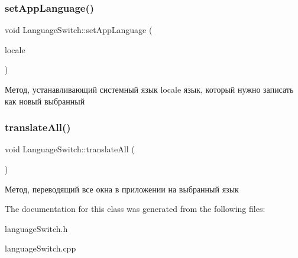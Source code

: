 \subsubsection{\texorpdfstring{setAppLanguage()}{setAppLanguage()}}
{\footnotesize\ttfamily void Language\+Switch\+::set\+App\+Language (\begin{DoxyParamCaption}\item[{Q\+String}]{locale }\end{DoxyParamCaption})}

Метод, устанавливающий системный язык locale язык, который нужно записать как новый выбранный \mbox{\label{class_language_switch_a771b7ad7302497cff07d2c22c32974a1}} 
\subsubsection{\texorpdfstring{translateAll()}{translateAll()}}
{\footnotesize\ttfamily void Language\+Switch\+::translate\+All (\begin{DoxyParamCaption}{ }\end{DoxyParamCaption})}

Метод, переводящий все окна в приложении на выбранный язык 

The documentation for this class was generated from the following files\+:\begin{DoxyCompactItemize}
\item 
language\+Switch.\+h\item 
language\+Switch.\+cpp\end{DoxyCompactItemize}
